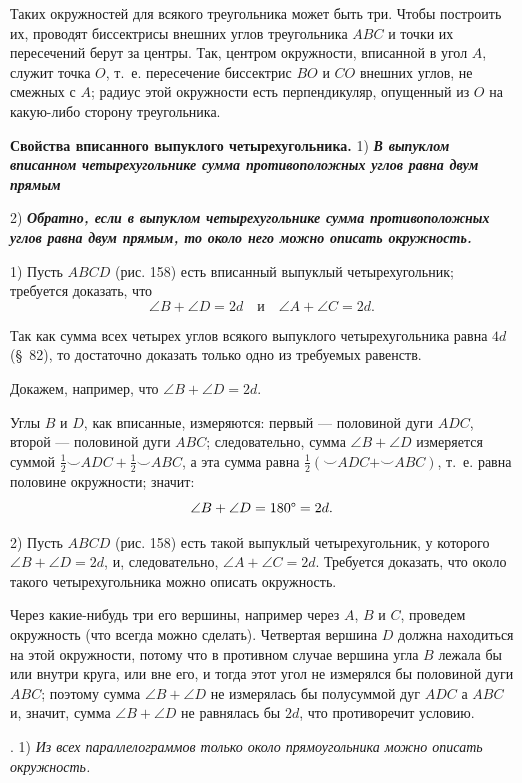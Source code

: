 \documentclass[oneside]{book}
\begin{document}
Таких окружностей для всякого треугольника может быть три.
Чтобы построить их, проводят биссектрисы внешних углов треугольника $ABC$ и точки их пересечений берут за центры.
Так, центром окружности, вписанной в угол $A$, служит точка $O$, т.~е.
пересечение биссектрис $BO$ и $CO$ внешних углов, не смежных с $A$;
радиус этой окружности есть перпендикуляр, опущенный из $O$ на какую-либо сторону треугольника.

\textbf{Свойства вписанного выпуклого четырехугольника.}
1) \textbf{\emph{В выпуклом вписанном четырехугольнике сумма противоположных углов равна двум прямым}}

2) \textbf{\emph{Обратно, если в выпуклом четырехугольнике сумма противоположных углов равна двум прямым, то около него можно описать окружность.}}

1) Пусть $ABCD$ (рис. 158) есть вписанный выпуклый четырехугольник;
требуется доказать, что
\[\angle B+\angle D = 2d\quad\text{и}\quad \angle A + \angle C = 2d.\]

Так как сумма всех четырех углов всякого выпуклого четырехугольника равна $4d$ (§~82), то достаточно доказать только одно из требуемых равенств.

Докажем, например, что $\angle B+\angle D = 2d$.

Углы $B$ и $D$, как вписанные, измеряются:
первый — половиной дуги $ADC$, второй — половиной дуги $ABC$;
следовательно, сумма $\angle B+\angle D$ измеряется суммой $\tfrac12{\smallsmile}ADC + \tfrac12{\smallsmile}ABC$, а эта сумма равна $\tfrac12({\smallsmile}ADC+{\smallsmile}ABC)$, т.~е.
равна половине окружности;
значит:
\[\angle B+\angle D=180\degree = 2d.\]

2) Пусть $ABCD$ (рис. 158) есть такой выпуклый четырехугольник, у которого $\angle B+\angle D = 2d$, и, следовательно, $\angle A + \angle C = 2d$.
Требуется доказать, что около такого четырехугольника можно описать окружность.

Через какие-нибудь три его вершины, например через $A$, $B$ и $C$, проведем окружность (что всегда можно сделать).
Четвертая вершина $D$ должна находиться на этой окружности, потому что в противном случае вершина угла $B$ лежала бы или внутри круга, или вне его, и тогда этот угол не измерялся бы половиной дуги $ABC$;
поэтому сумма $\angle B+\angle D$ не измерялась бы полусуммой дуг $ADC$ а $ABC$ и, значит, сумма $\angle B+\angle D$ не равнялась бы $2d$, что противоречит условию.

.
1) \emph{Из всех параллелограммов только около прямоугольника можно описать окружность.}
\end{document}
